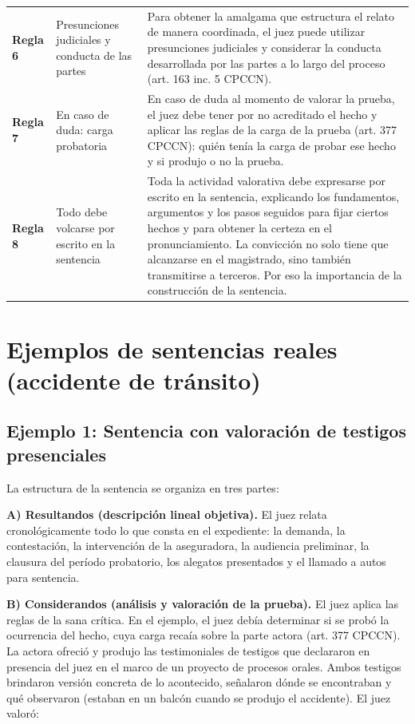 \documentclass[12pt,oneside]{book}
\begin{document}
\begin{longtable}{>{\raggedright\arraybackslash}p{} >{\raggedright\arraybackslash}p{} >{\raggedright\arraybackslash}X}
\textbf{Regla 6} & Presunciones judiciales y conducta de las partes & Para obtener la amalgama que estructura el relato de manera coordinada, el juez puede utilizar presunciones judiciales y considerar la conducta desarrollada por las partes a lo largo del proceso (art. 163 inc. 5 CPCCN). \\
\addlinespace

\textbf{Regla 7} & En caso de duda: carga probatoria & En caso de duda al momento de valorar la prueba, el juez debe tener por no acreditado el hecho y aplicar las reglas de la carga de la prueba (art. 377 CPCCN): quién tenía la carga de probar ese hecho y si produjo o no la prueba. \\
\addlinespace

\textbf{Regla 8} & Todo debe volcarse por escrito en la sentencia & Toda la actividad valorativa debe expresarse por escrito en la sentencia, explicando los fundamentos, argumentos y los pasos seguidos para fijar ciertos hechos y para obtener la certeza en el pronunciamiento. La convicción no solo tiene que alcanzarse en el magistrado, sino también transmitirse a terceros. Por eso la importancia de la construcción de la sentencia. \\

\end{longtable}

\section{Ejemplos de sentencias reales (accidente de tránsito)}

\subsection{Ejemplo 1: Sentencia con valoración de testigos presenciales}

La estructura de la sentencia se organiza en tres partes:

\textbf{A) Resultandos (descripción lineal objetiva).} El juez relata cronológicamente todo lo que consta en el expediente: la demanda, la contestación, la intervención de la aseguradora, la audiencia preliminar, la clausura del período probatorio, los alegatos presentados y el llamado a autos para sentencia.

\textbf{B) Considerandos (análisis y valoración de la prueba).} El juez aplica las reglas de la sana crítica. En el ejemplo, el juez debía determinar si se probó la ocurrencia del hecho, cuya carga recaía sobre la parte actora (art. 377 CPCCN). La actora ofreció y produjo las testimoniales de testigos que declararon en presencia del juez en el marco de un proyecto de procesos orales. Ambos testigos brindaron versión concreta de lo acontecido, señalaron dónde se encontraban y qué observaron (estaban en un balcón cuando se produjo el accidente). El juez valoró:
\end{document}
